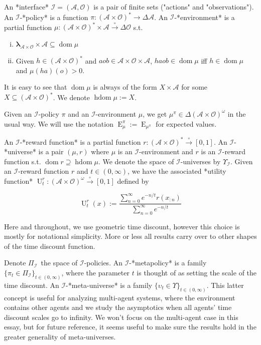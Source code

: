 \documentclass[a4paper]{article}
\DeclareMathOperator{\Dom}{dom}
\DeclareMathOperator{\E}{E}
\newcommand{\Estr}{\boldsymbol{\lambda}}
\newcommand{\PF}{\xrightarrow{\circ}}
\newcommand{\Ob}{\mathcal{O}}
\newcommand{\A}{\mathcal{A}}
\newcommand{\I}{\mathcal{I}}
\newcommand{\FH}{(\A \times \Ob)^*}
\newcommand{\IH}{(\A \times \Ob)^\omega}
\DeclareMathOperator{\HD}{hdom}
\newcommand{\Ut}{\operatorname{U}}
\begin{document}
An *interface* $\I = (\A,\Ob)$ is a pair of finite sets  ("actions" and "observations"). An $\I$-*policy* is a function $\pi: \FH \rightarrow \Delta\A$. An $\I$-*environment* is a partial function $\mu: \FH \times \A \PF \Delta\Ob$ s.t. 

\begin{enumerate}[i.]

\item $\Estr_{\A \times \Ob} \times \A \subseteq \Dom \mu$
\item Given $h \in \FH$ and $aob \in \A \times \Ob \times \A$, $haob \in \Dom \mu$ iff $h \in \Dom \mu$ and $\mu(ha)(o) > 0$.

\end{enumerate}

It is easy to see that $\Dom \mu$ is always of the form $X \times \A$ for some $X \subseteq \FH$. We denote $\HD \mu := X$.

Given an $\I$-policy $\pi$ and an $\I$-environment $\mu$, we get $\mu^\pi \in \Delta\IH$ in the usual way. We will use the notation $\E_\mu^\pi := \E_{\mu^\pi}$ for expected values.

An $\I$-*reward function* is a partial function $r: (\A \times \Ob)^* \PF [0,1]$. An $\I$-*universe* is a pair $(\mu,r)$ where $\mu$ is an $\I$-environment and $r$ is an $\I$-reward function s.t. $\Dom{r} \supseteq \HD{\mu}$. We denote the space of $\I$-universes by $\Upsilon_\I$. Given an $\I$-reward function $r$ and $t \in (0,\infty)$, we have the associated *utility function* $\Ut_t^r: \IH \PF [0,1]$ defined by

$$\Ut_t^{r}(x):=\frac{\sum_{n=0}^\infty e^{-n/t} r(x_{:n})}{\sum_{n=0}^\infty e^{-n/t}}$$

Here and throughout, we use geometric time discount, however this choice is mostly for notational simplicity. More or less all results carry over to other shapes of the time discount function.

Denote $\Pi_{\I}$\ the space of $\I$-policies. An $\I$-*metapolicy* is a family $\{\pi_t \in \Pi_\I\}_{t \in (0, \infty)}$, where the parameter $t$ is thought of as setting the scale of the time discount. An $\I$-*meta-universe* is a family $\{\upsilon_t \in \Upsilon\}_{t \in (0, \infty)}$. This latter concept is useful for analyzing multi-agent systems, where the environment contains other agents and we study the asymptotics when all agents' time discount scales go to infinity. We won't focus on the multi-agent case in this essay, but for future reference, it seems useful to make sure the results hold in the greater generality of meta-universes.
\end{document}
